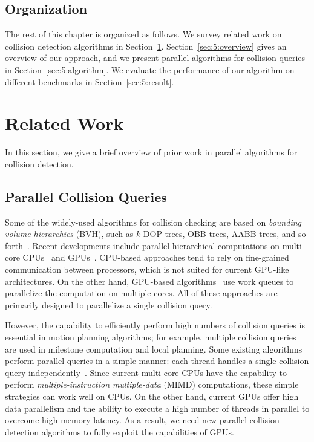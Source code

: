 \subsection{Organization}
The rest of this chapter is organized as follows. We survey related work on collision detection
algorithms in Section~\ref{sec:5:related}. Section~\ref{sec:5:overview} gives an overview of our approach, and we present parallel algorithms
for collision queries in Section~\ref{sec:5:algorithm}. We evaluate the performance of our algorithm on different benchmarks in Section~\ref{sec:5:result}.

\section{Related Work}
\label{sec:5:related}
In this section, we give a brief overview of prior work in parallel algorithms for collision
detection.

\subsection{Parallel Collision Queries}
Some of the widely-used algorithms for collision checking are based on \emph{bounding volume hierarchies} (BVH),
such as $k$-DOP trees, OBB trees, AABB trees, and so forth~\cite{LM03}. Recent developments include parallel hierarchical computations on multi-core CPUs~\cite{Kim08,TMT10-GMOD} and GPUs~\cite{Lauterbach10}. CPU-based approaches tend to rely on fine-grained communication
between processors, which is not suited for current GPU-like architectures. On the other hand, GPU-based
algorithms~\cite{Lauterbach10} use work queues
to parallelize the computation on multiple cores. All of these approaches are primarily designed to parallelize a
single collision query.

However, the capability to efficiently perform high numbers of collision queries is essential in motion planning algorithms; for example, multiple collision queries are used in milestone computation and local planning. Some existing algorithms
perform parallel queries in a simple manner: each thread handles a single collision query independently~\cite{Amato99,akinc+2003:prt-p}. Since current multi-core CPUs have the capability to perform \emph{multiple-instruction multiple-data} (MIMD) computations, these simple strategies can work well on CPUs.
On the other hand, current GPUs offer high data parallelism and the ability to execute a high number of threads
in parallel to overcome high memory latency. As a result, we need new parallel collision detection algorithms
to fully exploit the capabilities of GPUs.

